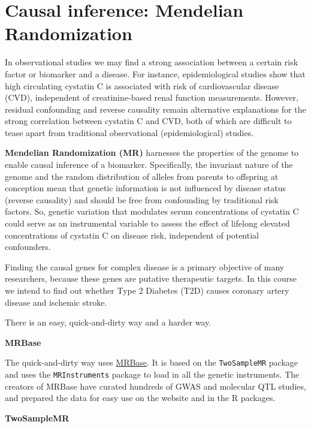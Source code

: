 \documentclass[
]{book}
\newcommand{\passthrough}[1]{#1}
\begin{document}
\hypertarget{causal-inference-mendelian-randomization}{%
\section{Causal inference: Mendelian Randomization}\label{causal-inference-mendelian-randomization}}

In observational studies we may find a strong association between a certain risk factor or biomarker and a disease. For instance, epidemiological studies show that high circulating cystatin C is associated with risk of cardiovascular disease (CVD), independent of creatinine-based renal function measurements\citep{vanderlaan2016}. However, residual confounding and reverse causality remain alternative explanations for the strong correlation between cystatin C and CVD, both of which are difficult to tease apart from traditional observational (epidemiological) studies.

\textbf{Mendelian Randomization (MR)} harnesses the properties of the genome to enable causal inference of a biomarker. Specifically, the invariant nature of the genome and the random distribution of alleles from parents to offspring at conception mean that genetic information is not influenced by disease status (reverse causality) and should be free from confounding by traditional risk factors\citep{vanderlaan2016}. So, genetic variation that modulates serum concentrations of cystatin C could serve as an instrumental variable to assess the effect of lifelong elevated concentrations of cystatin C on disease risk, independent of potential confounders\citep{vanderlaan2016}.

Finding the causal genes for complex disease is a primary objective of many researchers, because these genes are putative therapeutic targets. In this course we intend to find out whether Type 2 Diabetes (T2D) causes coronary artery disease and ischemic stroke.

There is an easy, quick-and-dirty way and a harder way.

\textbf{MRBase}

The quick-and-dirty way uses \href{http://www.mrbase.org/}{MRBase}. It is based on the \passthrough{\lstinline!TwoSampleMR!} package and uses the \passthrough{\lstinline!MRInstruments!} package to load in all the genetic instruments. The creators of MRBase have curated hundreds of GWAS and molecular QTL studies, and prepared the data for easy use on the website and in the R packages.

\textbf{TwoSampleMR}
\end{document}
